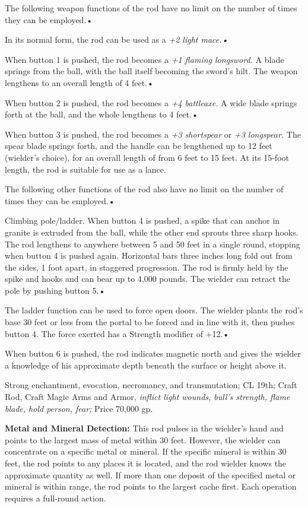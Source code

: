\documentclass{article}
\begin{document}
\parindent=0pt
The following weapon functions of the rod have no limit on the number of times 
they can be employed.• 

\parindent=3pt
In its normal form, the rod can be used as a \textit{+2 light mace.• }

When button 1 is pushed, the rod becomes a \textit{+1 flaming longsword. }A blade 
springs from the ball, with the ball itself becoming the sword's hilt. The weapon 
lengthens to an overall length of 4 feet.• 

When button 2 is pushed, the rod becomes a \textit{+4 battleaxe. }A wide blade 
springs forth at the ball, and the whole lengthens to 4 feet.• 

When button 3 is pushed, the rod becomes a \textit{+3 shortspear }or \textit{+3 
longspear. }The spear blade springs forth, and the handle can be lengthened up 
to 12 feet (wielder's choice), for an overall length of from 6 feet to 15 feet. 
At its 15-foot length, the rod is suitable for use as a lance.

\parindent=0pt
The following other functions of the rod also have no limit on the number of times 
they can be employed.• 

\parindent=3pt
Climbing pole/ladder. When button 4 is pushed, a spike that can anchor in granite 
is extruded from the ball, while the other end sprouts three sharp hooks. The rod 
lengthens to anywhere between 5 and 50 feet in a single round, stopping when button 
4 is pushed again. Horizontal bars three inches long fold out from the sides, 1 
foot apart, in staggered progression. The rod is firmly held by the spike and hooks 
and can bear up to 4,000 pounds. The wielder can retract the pole by pushing button 
5.• 

The ladder function can be used to force open doors. The wielder plants the rod's 
base 30 feet or less from the portal to be forced and in line with it, then pushes 
button 4. The force exerted has a Strength modifier of +12.• 

\parindent=7pt
When button 6 is pushed, the rod indicates magnetic north and gives the wielder 
a knowledge of his approximate depth beneath the surface or height above it.

\parindent=0pt
Strong enchantment, evocation, necromancy, and transmutation; CL 19th; Craft Rod, 
Craft Magic Arms and Armor, \textit{inflict light wounds, bull's strength, flame 
blade, hold person, fear; }Price 70,000 gp.

\textbf{Metal and Mineral Detection:} This rod pulses in the wielder's hand and 
points to the largest mass of metal within 30 feet. However, the wielder can concentrate 
on a specific metal or mineral. If the specific mineral is within 30 feet, the 
rod points to any places it is located, and the rod wielder knows the approximate 
quantity as well. If more than one deposit of the specified metal or mineral is 
within range, the rod points to the largest cache first. Each operation requires 
a full-round action.
\end{document}
